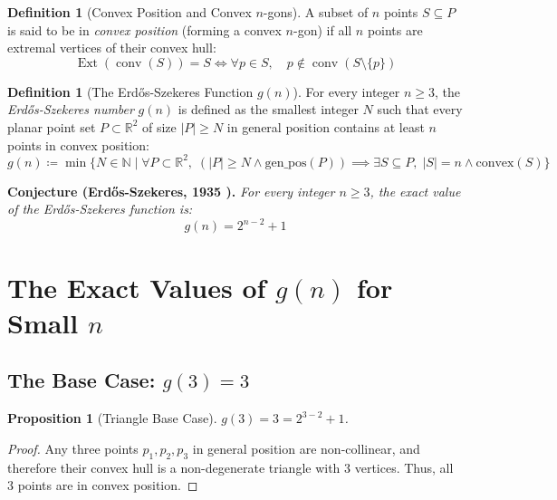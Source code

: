 \documentclass[11pt,a4paper]{article}
\newtheorem{proposition}[theorem]{Proposition}
\theoremstyle{definition}
\newtheorem{definition}[theorem]{Definition}
\begin{document}
\begin{definition}[Convex Position and Convex $n$-gons]\label{def:convex_pos}
A subset of $n$ points $S \subseteq P$ is said to be in \emph{convex position} (forming a convex $n$-gon) if all $n$ points are extremal vertices of their convex hull:
\begin{equation}\label{eq:convex_pos}
\operatorname{Ext}(\operatorname{conv}(S)) = S \iff \forall p \in S, \quad p \notin \operatorname{conv}(S \setminus \{p\})
\end{equation}
\end{definition}

\begin{definition}[The Erd\H{o}s-Szekeres Function $g(n)$]\label{def:gn}
For every integer $n \ge 3$, the \emph{Erd\H{o}s-Szekeres number} $g(n)$ is defined as the smallest integer $N$ such that every planar point set $P \subset \mathbb{R}^2$ of size $|P| \ge N$ in general position contains at least $n$ points in convex position:
\begin{equation}\label{eq:gn_def}
g(n) \coloneqq \min \{ N \in \mathbb{N} \mid \forall P \subset \mathbb{R}^2, \; (|P| \ge N \land \text{gen\_pos}(P)) \implies \exists S \subseteq P, \; |S| = n \land \text{convex}(S) \}
\end{equation}
\end{definition}

\noindent\textbf{Conjecture (Erd\H{o}s-Szekeres, 1935 \cite{erdos1935}).} \textit{For every integer $n \ge 3$, the exact value of the Erd\H{o}s-Szekeres function is:}
\begin{equation}\label{eq:es_conj}
g(n) = 2^{n-2} + 1
\end{equation}

\section{The Exact Values of $g(n)$ for Small $n$}

\subsection{The Base Case: $g(3) = 3$}
\begin{proposition}[Triangle Base Case]\label{prop:g3}
$g(3) = 3 = 2^{3-2} + 1$.
\end{proposition}
\begin{proof}
Any three points $p_1, p_2, p_3$ in general position are non-collinear, and therefore their convex hull is a non-degenerate triangle with 3 vertices. Thus, all 3 points are in convex position.
\end{proof}
\end{document}
